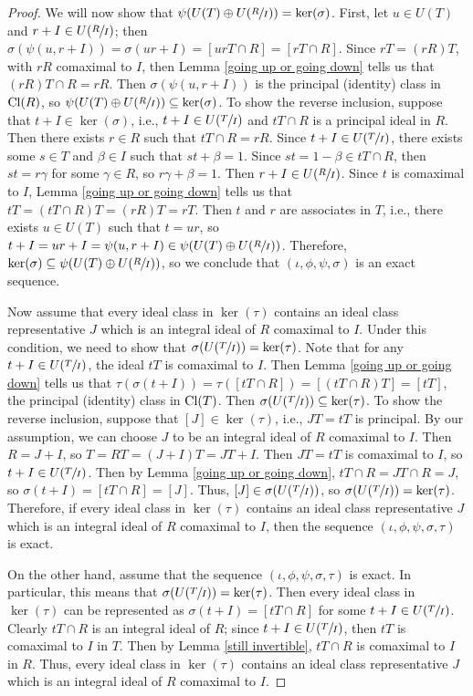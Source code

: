 \documentclass[12pt]{amsart}
\theoremstyle{definition}
\newcommand{\Cl}{\textup{Cl}}
\begin{document}
\begin{proof}
    We will now show that $\psi(U(T)\oplus U(\sfrac{R}{I}))=\ker(\sigma)$. First, let $u\in U(T)$ and $r+I\in U(\sfrac{R}{I})$; then $\sigma(\psi(u,r+I))=\sigma(ur+I)=[urT\cap R]=[rT\cap R]$. Since $rT=(rR)T$, with $rR$ comaximal to $I$, then Lemma \ref{going up or going down} tells us that $(rR)T\cap R=rR$. Then $\sigma(\psi(u,r+I))$ is the principal (identity) class in $\Cl(R)$, so $\psi(U(T)\oplus U(\sfrac{R}{I}))\subseteq \ker(\sigma)$. To show the reverse inclusion, suppose that $t+I\in \ker(\sigma)$, i.e., $t+I\in U(\sfrac{T}{I})$ and $tT\cap R$ is a principal ideal in $R$. Then there exists $r\in R$ such that $tT\cap R=rR$. Since $t+I\in U(\sfrac{T}{I})$, there exists some $s\in T$ and $\beta\in I$ such that $st+\beta=1$. Since $st=1-\beta\in tT\cap R$, then $st=r\gamma$ for some $\gamma\in R$, so $r\gamma+\beta=1$. Then $r+I\in U(\sfrac{R}{I})$. Since $t$ is comaximal to $I$, Lemma \ref{going up or going down} tells us that $tT=(tT\cap R)T=(rR)T=rT$. Then $t$ and $r$ are associates in $T$, i.e., there exists $u\in U(T)$ such that $t=ur$, so $t+I=ur+I=\psi(u,r+I)\in \psi(U(T)\oplus U(\sfrac{R}{I}))$. Therefore, $\ker(\sigma)\subseteq \psi(U(T)\oplus U(\sfrac{R}{I}))$, so we conclude that $(\iota,\phi,\psi,\sigma)$ is an exact sequence.

    Now assume that every ideal class in $\ker(\tau)$ contains an ideal class representative $J$ which is an integral ideal of $R$ comaximal to $I$. Under this condition, we need to show that $\sigma(U(\sfrac{T}{I}))=\ker(\tau)$. Note that for any $t+I\in U(\sfrac{T}{I})$, the ideal $tT$ is comaximal to $I$. Then Lemma \ref{going up or going down} tells us that $\tau(\sigma(t+I))=\tau([tT\cap R])=[(tT\cap R)T]=[tT]$, the principal (identity) class in $\Cl(T)$. Then $\sigma(U(\sfrac{T}{I}))\subseteq\ker(\tau)$. To show the reverse inclusion, suppose that $[J]\in \ker(\tau)$, i.e., $JT=tT$ is principal. By our assumption, we can choose $J$ to be an integral ideal of $R$ comaximal to $I$. Then $R=J+I$, so $T=RT=(J+I)T=JT+I$. Then $JT=tT$ is comaximal to $I$, so $t+I\in U(\sfrac{T}{I})$. Then by Lemma \ref{going up or going down}, $tT\cap R=JT\cap R=J$, so $\sigma(t+I)=[tT\cap R]=[J]$. Thus, $[J]\in \sigma(U(\sfrac{T}{I}))$, so $\sigma(U(\sfrac{T}{I}))=\ker(\tau)$. Therefore, if every ideal class in $\ker(\tau)$ contains an ideal class representative $J$ which is an integral ideal of $R$ comaximal to $I$, then the sequence $(\iota,\phi,\psi,\sigma,\tau)$ is exact.

    On the other hand, assume that the sequence $(\iota,\phi,\psi,\sigma,\tau)$ is exact. In particular, this means that $\sigma(U(\sfrac{T}{I}))=\ker(\tau)$. Then every ideal class in $\ker(\tau)$ can be represented as $\sigma(t+I)=[tT\cap R]$ for some $t+I\in U(\sfrac{T}{I})$. Clearly $tT\cap R$ is an integral ideal of $R$; since $t+I\in U(\sfrac{T}{I})$, then $tT$ is comaximal to $I$ in $T$. Then by Lemma \ref{still invertible}, $tT\cap R$ is comaximal to $I$ in $R$. Thus, every ideal class in $\ker(\tau)$ contains an ideal class representative $J$ which is an integral ideal of $R$ comaximal to $I$.


\end{proof}
\end{document}
